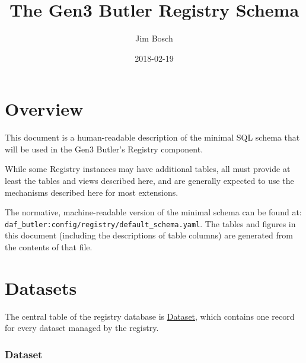\documentclass[DM,toc]{lsstdoc}
\title{The Gen3 Butler Registry Schema}
\author{Jim Bosch}
\date{2018-02-19}
\newcommand{\tblref}[1]{\hyperref[tbl:#1]{#1}}
\begin{document}
\maketitle

\section{Overview}
\label{sec:overview}

This document is a human-readable description of the minimal SQL schema that will be used in the Gen3 Butler's Registry component.

While some Registry instances may have additional tables, all must provide at least the tables and views described here, and are generally expected to use the mechanisms described here for most extensions.

The normative, machine-readable version of the minimal schema can be found at: \verb`daf_butler:config/registry/default_schema.yaml`.
The tables and figures in this document (including the descriptions of table columns) are generated from the contents of that file.


\section{Datasets}
\label{sec:datasets}

The central table of the registry database is \tblref{Dataset}, which contains one record for every dataset managed by the registry.

\subsubsection*{Dataset}
\label{tbl:Dataset}

{
    \footnotesize
    
}
\end{document}
